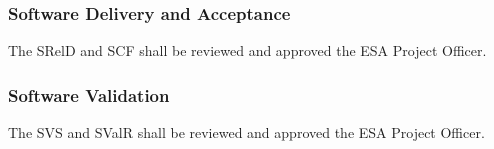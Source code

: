 \subsubsection{Software Delivery and Acceptance}
The SRelD and SCF shall be reviewed and approved the ESA Project Officer.

\subsubsection{Software Validation}
The SVS and SValR shall be reviewed and approved the ESA Project Officer.



